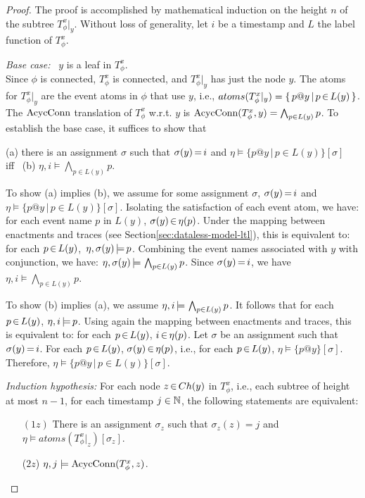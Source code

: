 \begin{proof}
The proof is accomplished by
mathematical induction on 
the height $n$ of the subtree $T_\phi^x|_y$.
Without loss of generality,
let $i$ be a timestamp
and
$L$ the label function of $T_\phi^x$.

\smallskip

{\em Base case:}~ $y$ is a leaf in $T_\phi^x$.\\
Since $\phi$ is connected, $T_\phi^x$ is connected,
and $T_\phi^x|_y$ has just the node $y$.
The atoms for $T_\phi^x|_y$ are
the event atoms in $\phi$ that use $y$,
i.e., $atoms(T_\phi^x|_y)= \{\, p@y\,|\, p\,{\in}\, L(y)\,\}$.
The $\text{AcycConn}$ translation of $T_\phi^x$
w.r.t. $y$ is
$\text{AcycConn}(T_\phi^x,y)=\bigwedge_{p\in L(y)}p$.
To establish the base case,
it suffices to show that

(a) there is an assignment $\sigma$ such that
$\sigma(y)\,{=}\,i$ and
$\eta\models \{p@y\,|\,p\in L(y)\}[\sigma]$
\\
iff
~(b) $\eta,i\models\bigwedge_{p\in L(y)}p$.

\smallskip

To show (a) implies (b),
we assume for some assignment $\sigma$,
$\sigma(y)\,{=}\,i$ and
$\eta\models \{p@y\,|\,p\in L(y)\}[\sigma]$.
Isolating the satisfaction of each event atom,
we have:
for each event name $p$ in $L(y)$,
$\sigma(y)\,{\in}\, \eta(p)$.
Under the mapping between enactments and traces
(see Section\:\ref{sec:dataless-model-ltl}),
this is equivalent to:
for each $p\,{\in}\, L(y)$,\, $\eta,\sigma(y)\,{\models}\, p$.
Combining the event names associated with $y$ 
with conjunction,
we have: $\eta,\sigma(y)\,{\models}\,\bigwedge_{p\in L(y)}p$.
Since $\sigma(y)\,{=}\,i$,
we have $\eta,i\models \bigwedge_{p\in L(y)}p$.

To show (b) implies (a),
we assume $\eta,i\,{\models}\,\bigwedge_{p\in L(y)}p$.
It follows that
for each $p\,{\in}\, L(y)$, $\eta,i \,{\models}\, p$.
Using again the mapping between enactments and traces,
this is equivalent to:
for each $p\,{\in}\, L(y)$, $i\,{\in}\, \eta(p)$.
Let $\sigma$ be an assignment such that $\sigma(y)\,{=}\,i$.
For each $p\,{\in}\, L(y)$, $\sigma(y)\,{\in}\, \eta(p)$,
i.e.,
for each $p\,{\in}\, L(y)$, $\eta\models\{p@y\}[\sigma]$.
Therefore,
$\eta\models\{p@y\,|\,p\in L(y)\}[\sigma]$.

\medskip

{\em Induction hypothesis:}
For each node $z\,{\in}\, Ch(y)$ in $T_\phi^x$,
i.e., each subtree of height at most $n-1$,
for each timestamp $j\in\mathbb{N}$,
the following statements are equivalent:
\begin{enumerate}
\item[$(1z)$]
There is an assignment $\sigma_z$ such that
$\sigma_z(z)=j$ and
$\eta\models atoms(T_\phi^x|_z)[\sigma_z]$.
\item[($2z$)]
$\eta,j \models \text{AcycConn}(T_\phi^x,z)$.
\end{enumerate}


\end{proof}
